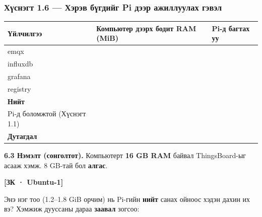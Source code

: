 \hypertarget{ux445ux4afux441ux43dux44dux433ux442-1.6-ux445ux44dux440ux44dux432-ux431ux4afux433ux434ux438ux439ux433-pi-ux434ux44dux44dux440-ux430ux436ux438ux43bux43bux443ux443ux43bux430ux445-ux433ux44dux432ux44dux43b}{%
\subsubsection{Хүснэгт 1.6 --- Хэрэв бүгдийг Pi дээр ажиллуулах гэвэл}\label{ux445ux4afux441ux43dux44dux433ux442-1.6-ux445ux44dux440ux44dux432-ux431ux4afux433ux434ux438ux439ux433-pi-ux434ux44dux44dux440-ux430ux436ux438ux43bux43bux443ux443ux43bux430ux445-ux433ux44dux432ux44dux43b}}

\begingroup\scriptsize\begin{longtable}[]{@{}lll@{}}
\toprule
Үйлчилгээ & Компьютер дээрх бодит RAM (MiB) & Pi-д багтах уу\tabularnewline
\midrule
\endhead
emqx & &\tabularnewline
influxdb & &\tabularnewline
grafana & &\tabularnewline
registry & &\tabularnewline
\textbf{Нийт} & &\tabularnewline
Pi-д боломжтой (Хүснэгт 1.1) & &\tabularnewline
\textbf{Дутагдал} & &\tabularnewline
\bottomrule
\end{longtable}\endgroup

\textbf{6.3 Нэмэлт (сонголтот).} Компьютерт \textbf{16 GB RAM} байвал ThingsBoard-ыг асааж хэмж. 8 GB-тай бол \textbf{алгас}.

\textbf{{[}ЗК · Ubuntu-1{]}}

\begin{Shaded}
\begin{Highlighting}[]
\KeywordTok{\textbackslash{}}
\end{Highlighting}
\end{Shaded}

Энэ нэг тоо (1.2--1.8 GiB орчим) нь Pi-гийн \textbf{нийт} санах ойноос хэдэн дахин их вэ? Хэмжиж дууссаны дараа \textbf{заавал} зогсоо:

\begin{Shaded}
\begin{Highlighting}[]
\end{Highlighting}
\end{Shaded}

